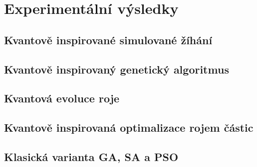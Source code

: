 \chapter{Experimentální výsledky} \label{chapt:experiments}
\section{Kvantově inspirované simulované žíhání}\label{sec:exp-qiga}
\section{Kvantově inspirovaný genetický algoritmus}\label{sec:exp-qisa}
\section{Kvantová evoluce roje}\label{sec:exp-qse}
\section{Kvantově inspirovaná optimalizace rojem částic}\label{sec:exp-qipso}
\section{Klasická varianta GA, SA a PSO}\label{sec:exp-ea}